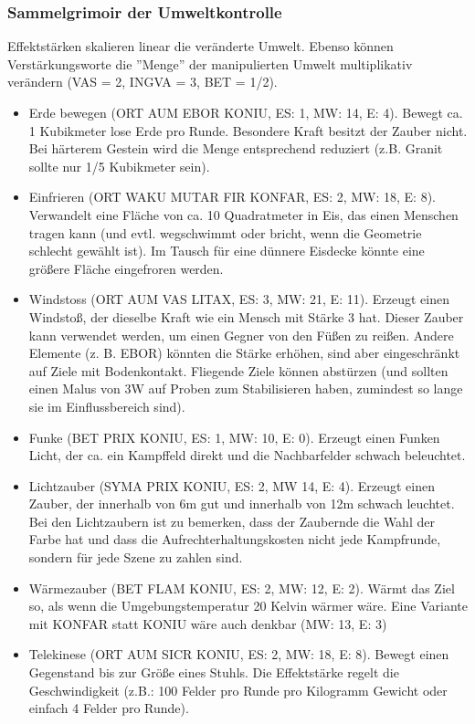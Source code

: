 \documentclass{article}
\begin{document}
\subsubsection{Sammelgrimoir der Umweltkontrolle}

Effektstärken skalieren linear die veränderte Umwelt. Ebenso können Verstärkungsworte die ''Menge'' der manipulierten
Umwelt multiplikativ verändern (VAS = 2, INGVA = 3, BET = 1/2).

\begin{itemize}
\item Erde bewegen (ORT AUM EBOR KONIU, ES: 1, MW: 14, E: 4). Bewegt ca. 1 Kubikmeter lose Erde pro Runde. Besondere Kraft besitzt der Zauber nicht. Bei härterem Gestein wird die Menge entsprechend reduziert (z.B. Granit sollte nur 1/5 Kubikmeter sein).
\item Einfrieren (ORT WAKU MUTAR FIR KONFAR, ES: 2, MW: 18, E: 8). Verwandelt eine Fläche von ca. 10 Quadratmeter in Eis, das einen Menschen tragen kann (und evtl. wegschwimmt oder bricht, wenn die Geometrie schlecht gewählt ist). Im Tausch für eine dünnere Eisdecke könnte eine größere Fläche eingefroren werden.
\item Windstoss (ORT AUM VAS LITAX, ES: 3, MW: 21, E: 11). Erzeugt einen Windstoß, der dieselbe Kraft wie ein Mensch mit Stärke 3 hat. Dieser Zauber kann verwendet werden, um einen Gegner von den Füßen zu reißen. Andere Elemente (z. B. EBOR) könnten die Stärke erhöhen, sind aber eingeschränkt auf Ziele mit Bodenkontakt. Fliegende Ziele können abstürzen (und sollten einen Malus von 3W auf Proben zum Stabilisieren haben, zumindest so lange sie im Einflussbereich sind).
\item Funke (BET PRIX KONIU, ES: 1, MW: 10, E: 0). Erzeugt einen Funken Licht, der ca. ein Kampffeld direkt und die Nachbarfelder schwach beleuchtet.
\item Lichtzauber (SYMA PRIX KONIU, ES: 2, MW 14, E: 4). Erzeugt einen Zauber, der innerhalb von 6m gut und innerhalb von 12m schwach leuchtet. Bei den Lichtzaubern ist zu bemerken, dass der Zaubernde die Wahl der Farbe hat und dass die Aufrechterhaltungskosten nicht jede Kampfrunde, sondern für jede Szene zu zahlen sind.
\item Wärmezauber (BET FLAM KONIU, ES: 2, MW: 12, E: 2). Wärmt das Ziel so, als wenn die Umgebungstemperatur 20 Kelvin wärmer wäre. Eine Variante mit KONFAR statt KONIU wäre auch denkbar (MW: 13, E: 3)
\item Telekinese (ORT AUM SICR KONIU, ES: 2, MW: 18, E: 8). Bewegt einen Gegenstand bis zur Größe eines Stuhls. Die Effektstärke regelt die Geschwindigkeit (z.B.: 100 Felder pro Runde pro Kilogramm Gewicht oder einfach 4 Felder pro Runde).

\end{itemize}
\end{document}
